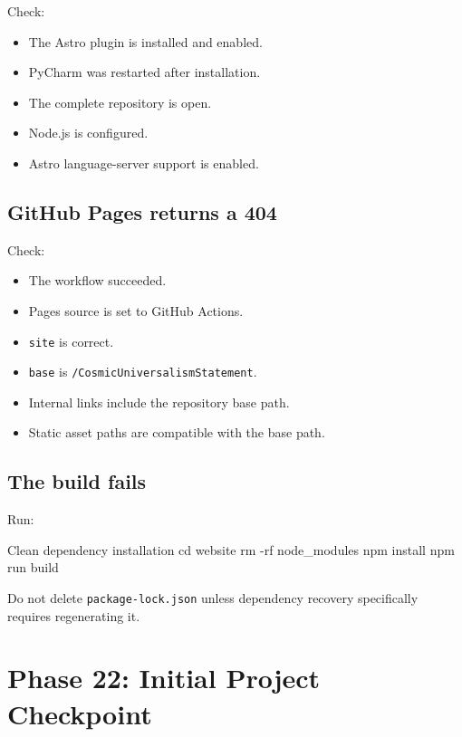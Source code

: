 \documentclass[11pt,letterpaper]{article}
\newcommand{\filepath}[1]{\texttt{#1}}
\begin{document}
Check:

\begin{itemize}
    \item The Astro plugin is installed and enabled.
    \item PyCharm was restarted after installation.
    \item The complete repository is open.
    \item Node.js is configured.
    \item Astro language-server support is enabled.
\end{itemize}

\subsection{GitHub Pages returns a 404}

Check:

\begin{itemize}
    \item The workflow succeeded.
    \item Pages source is set to GitHub Actions.
    \item \texttt{site} is correct.
    \item \texttt{base} is
          \texttt{/CosmicUniversalismStatement}.
    \item Internal links include the repository base path.
    \item Static asset paths are compatible with the base path.
\end{itemize}

\subsection{The build fails}

Run:

\begin{commandbox}{Clean dependency installation}
cd website
rm -rf node_modules
npm install
npm run build
\end{commandbox}

Do not delete \filepath{package-lock.json} unless dependency recovery
specifically requires regenerating it.

\section{Phase 22: Initial Project Checkpoint}
\end{document}
